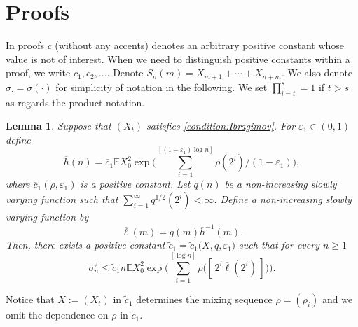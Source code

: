 \documentclass[11pt,a4,leqno]{amsart}
\newtheorem{lemma}{Lemma}[section]
\newcommand{\ov}{\overline}
\newcommand{\wt}{\widetilde}
\newcommand{\vep}{\varepsilon}
\newcommand{\E }{{\mathbb E}}
\newcommand{\1}{{\mathbf 1}}
\begin{document}
\section{Proofs}
\label{sec:proofs}
In proofs $c$ (without any accents) denotes an arbitrary positive constant whose value is not of interest.
When we need to distinguish positive constants within a proof, we write $c_1,c_2,\ldots$. 
Denote $S_n(m)= X_{m+1}+\cdots+ X_{n+m}$. We also denote $\sigma_\cdot=\sigma(\cdot)$ for simplicity of notation in the following.
We set $\prod_{i=t}^{s}=1$ if $t>s$ as regards the product notation. 

\begin{lemma}
\label{lemm:upper:bound}
 Suppose that $(X_t)$ satisfies \eqref{condition:Ibragimov}. For $\vep_1 \in (0,1)$ define 
\[
 \ov h(n)= \ov c_1 \E X_0^2 \exp\bigg(
\sum_{i=1}^{[(1-\vep_1) \log n]} \rho(2^i)/(1-\vep_1)
\bigg),
\]
where $\ov c_1( \rho, \vep_1)$ is a positive constant. 
Let $q(n)$ be a non-increasing slowly varying function such that 
$\sum_{i=1}^\infty q^{1/2}(2^i)<\infty$. 
Define a non-increasing slowly varying function by   
\[
 \ov \ell (m)= q(m) \ov h^{-1}(m).  
\]
Then, there exists a positive constant $\wt c_1 = \wt c_1\big( X,q,\vep_1 \big)$ such that for every $n\ge 1$
\[
 \sigma_n^2 \le \wt c_1 n \E X_0^2 \exp\bigg(\sum_{i=1}^{[\log n]} \rho \big(
[\,2^i \ov \ell (2^i)\,]
\big)
\bigg). 
\]
\end{lemma}

Notice that $X:=(X_t)$ in $\wt c_1$ determines the mixing sequence $\rho=(\rho_i)$ and we 
omit the dependence on $\rho$ in $\wt c_1$. 
\end{document}

